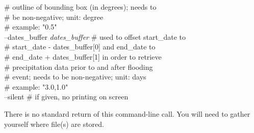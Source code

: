 \documentclass[10pt,a4paper,titlepage,parskip]{scrartcl}
\newenvironment{ttfont}{\fontfamily{\ttdefault}\selectfont}{\par}
\newcommand{\GRAU}[1]{\textcolor{ufzgray2}{#1}}
\begin{document}
\begin{framed}
\begin{ttfont}
\begin{tabbing}
			\> \> \GRAU{\# outline of bounding box (in degrees); needs to}\\
			\> \> \GRAU{\# be non-negative; unit: degree}\\
			\> \> \GRAU{\# example: "0.5"}\\
			\> --dates\_buffer \textit{dates\_buffer} \> \GRAU{\# used to offset start\_date to}\\
			\> \> \GRAU{\# start\_date - dates\_buffer[0] and end\_date to }\\
			\> \> \GRAU{\# end\_date + dates\_buffer[1] in order to retrieve}\\
			\> \> \GRAU{\# precipitation data prior to and after flooding}\\
			\> \> \GRAU{\# event; needs to be non-negative; unit: days}\\
			\> \> \GRAU{\# example: "3.0,1.0"}\\
			\> --silent \> \GRAU{\# if given, no printing on screen}\\
		\end{tabbing}
	\end{ttfont}
	\vspace*{-0.3cm}
\end{framed}
\vspace*{-0.3cm}
There is no standard return of this command-line call. You will need to gather yourself where file(s) are stored.
\pagebreak
\end{document}
